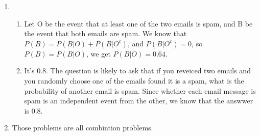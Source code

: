 \documentclass{article}
\begin{document}
\begin{enumerate}
	\item \begin{enumerate}
	\item Let O be the event that at least one of the two emails is spam, and B be the event that both emails are spam. We know that $P(B)=P(B|O)+P(B|O^c)$, and $P(B|O^c)=0$, so $P(B)=P(B|O)$, we get $P(B|O)=0.64$.
	\item It's 0.8. The question is likely to ask that if you reveiced two emails and you randomly choose one of the emails found it is a spam, what is the probability of another email is spam. Since whether each email message is spam is an independent event from the other, we know that the answwer is 0.8.
	\end{enumerate}
	\item Those problems are all combintion problems.
	

\end{enumerate}
\end{document}
